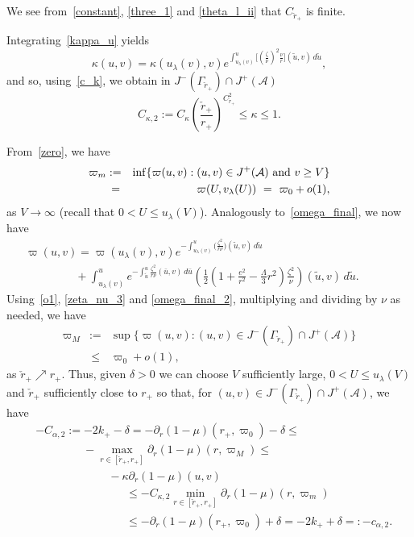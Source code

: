 \documentclass[a4paper,11pt,oneside,reqno]{amsart}
\newcommand{\kk}{k_+}
\newcommand{\cal}{\mathcal}
\newcommand{\ckrp}{\check r_+}
\begin{document}
We see from~\eqref{constant}, \eqref{three_1} and \eqref{theta_l_ii} that $C_{\ckrp}$ is finite.

Integrating~\eqref{kappa_u} yields
$$
\kappa(u,v)=\kappa(u_\lambda(v),v)e^{\int_{u_\lambda(v)}^u\bigl[\left(\frac{\zeta}{\nu}\right)^2
\frac{\nu} r\bigr](\tilde u,v)\,d\tilde u},
$$
and so, using~\eqref{c_k}, we obtain in $J^-(\Gamma_{\ckrp})\cap J^+({\cal A})$
\begin{equation}\label{kappa_2}
C_{\kappa,2}:=C_\kappa\left(\frac{\ckrp}{r_+}\right)^{C_{\ckrp}^2}\leq\kappa\leq 1.
\end{equation}

From~\eqref{zero}, we have 
\begin{eqnarray}
\varpi_m&:=&\inf\{\varpi(u,v):(u,v)\in J^+({\cal A})\ {\rm and}\ v\geq V\}
\label{omega_m}\\ 
&\,=&\varpi(U,v_\lambda(U))\ =\ \varpi_0+o(1),\nonumber
\end{eqnarray}
as $V\to\infty$ (recall that $0<U\leq u_\lambda(V)$). Analogously to~\eqref{omega_final}, we now have
\begin{eqnarray} 
\varpi(u,v)=\varpi(u_\lambda(v),v)e^{-\int_{u_\lambda(v)}^u\bigl(\frac{\zeta^2}{r\nu}\bigr)(\tilde u,v)\,d\tilde u}\qquad\qquad\qquad\qquad\qquad&&\nonumber\\ \qquad\qquad\ \  +
\int_{u_\lambda(v)}^ue^{-\int_{\tilde u}^u\frac{\zeta^2}{r\nu}(\bar u,v)\,d\bar u}\left(\frac{1}{2}\left(1+\frac{e^2}{r^2}
-\frac{\Lambda}{3}r^2\right)\frac{\zeta^2}{\nu}\right)(\tilde u,v)\,d\tilde u.&&\label{omega_final_2}
\end{eqnarray}
Using~\eqref{o1}, \eqref{zeta_nu_3} and \eqref{omega_final_2}, multiplying and dividing by $\nu$ as needed, we have
\begin{eqnarray}
\varpi_M&:=&\sup\{\varpi(u,v):(u,v)\in J^-(\Gamma_{\ckrp})\cap J^+({\cal A})\}
\label{omega_M}\\
&\,\leq&\varpi_0+o(1),\nonumber
\end{eqnarray}
as $\ckrp\nearrow r_+$.
Thus, given $\delta>0$ we can choose $V$ sufficiently large,
$0<U\leq u_\lambda(V)$
and $\ckrp$ sufficiently close to $r_+$
so that, for $(u,v)\in J^-(\Gamma_{\ckrp}) \cap J^+({\cal A})$, we have
\begin{align}
& -C_{\alpha,2}:=-2\kk-\delta=-\partial_r(1-\mu)(r_+,\varpi_0)-\delta\leq\label{C_alpha_2}\\
& \qquad\qquad\ -\max_{r\in[\ckrp,r_+]}\partial_r(1-\mu)(r,\varpi_M)\leq\nonumber\\
& \qquad\qquad\qquad\ \ -\kappa\partial_r(1-\mu)(u,v)\nonumber\\
&\qquad\qquad\qquad\qquad\leq-C_{\kappa,2}\min_{r\in[\ckrp,r_+]}\partial_r(1-\mu)(r,\varpi_m)\nonumber\\
& \qquad\qquad\qquad\qquad\leq-\partial_r(1-\mu)(r_+,\varpi_0)+\delta=-2\kk+\delta=:-c_{\alpha,2}.\label{c_alpha_2}
\end{align}
\end{document}
